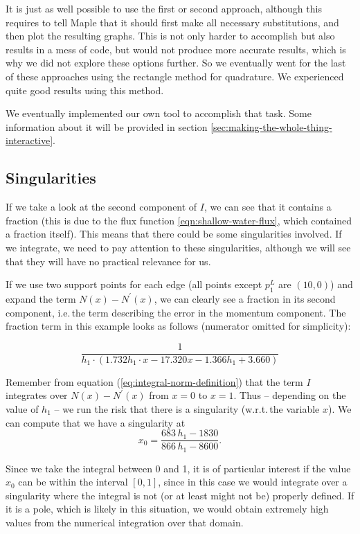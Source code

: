 \documentclass[a4paper, twoside]{article}
\begin{document}
It is just as well possible to use the first or second approach, although this requires to tell Maple that it should first make all necessary substitutions, and then plot the resulting graphs. This is not only harder to accomplish but also results in a mess of code, but would not produce more accurate results, which is why we did not explore these options further. So we eventually went for the last of these approaches using the rectangle method for quadrature. We experienced quite good results using this method.

We eventually implemented our own tool to accomplish that task.
Some information about it will be provided in section \ref{sec:making-the-whole-thing-interactive}.

\subsection{Singularities}
\label{sec:singularities}

If we take a look at the second component of $I$, we can see that it contains a fraction (this is due to the flux function \ref{eqn:shallow-water-flux}, which contained a fraction itself). This means that there could be some singularities involved. If we integrate, we need to pay attention to these singularities, although we will see that they will have no practical relevance for us.

If we use two support points for each edge (all points except $p_1^L$ are $(10,0)$) and expand the term $N\left(x\right)-N^\prime\left(x\right)$, we can clearly see a fraction in its second component, i.e.\,the term describing the error in the momentum component. The fraction term in this example looks as follows (numerator omitted for simplicity):

\begin{equation*}
  \frac{1}{h_1\cdot(1.732 h_1 \cdot x - 17.320 x - 1.366 h_1 + 3.660)}
\end{equation*}

Remember from equation (\ref{eq:integral-norm-definition}) that the term $I$ integrates over $N\left(x\right)-N^\prime\left(x\right)$ from $x=0$ to $x=1$. Thus -- depending on the value of $h_1$ -- we run the risk that there is a singularity (w.r.t.\,the variable $x$). We can compute that we have a singularity at
\begin{equation*}
  x_0=\frac{683\, h_1 - 1830}{866\, h_1 - 8600}.
\end{equation*}

Since we take the integral between 0 and 1, it is of particular interest if the value $x_0$ can be within the interval $\left[ 0,1 \right]$, since in this case we would integrate over a singularity where the integral is not (or at least might not be) properly defined. If it is a pole, which is likely in this situation, we would obtain extremely high values from the numerical integration over that domain.
\end{document}
